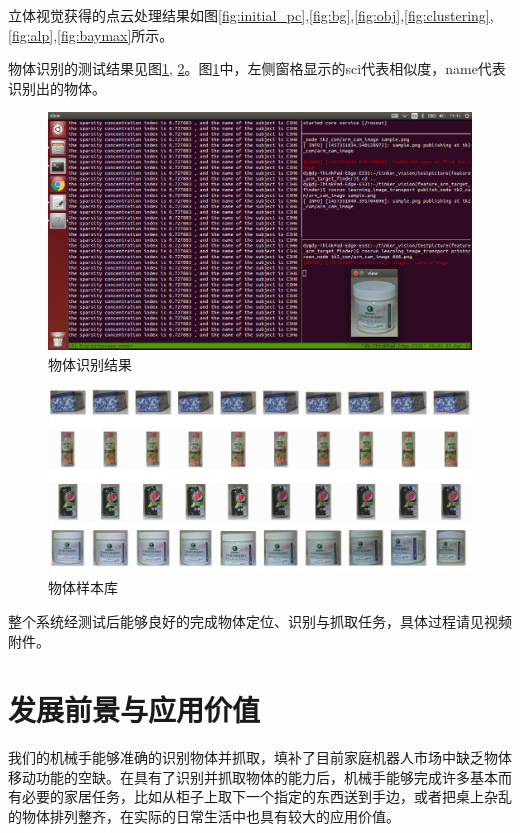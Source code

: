立体视觉获得的点云处理结果如图\ref{fig:initial_pc},\ref{fig:bg},\ref{fig:obj},\ref{fig:clustering},\ref{fig:alp},\ref{fig:baymax}所示。

物体识别的测试结果见图\ref{fig:du1}, \ref{fig:du2}。图\ref{fig:du1}中，左侧窗格显示的sci代表相似度，name代表识别出的物体。

\begin{figure}[H]
    \includegraphics[width = \textwidth]{images/du1.png}
    \caption{物体识别结果}
    \label{fig:du1}
\end{figure}

\begin{figure}[H]
    \includegraphics[width = \textwidth]{images/du2.png}
    \caption{物体样本库}
    \label{fig:du2}
\end{figure}

整个系统经测试后能够良好的完成物体定位、识别与抓取任务，具体过程请见视频附件。

\section{发展前景与应用价值}

我们的机械手能够准确的识别物体并抓取，填补了目前家庭机器人市场中缺乏物体移动功能的空缺。在具有了识别并抓取物体的能力后，机械手能够完成许多基本而有必要的家居任务，比如从柜子上取下一个指定的东西送到手边，或者把桌上杂乱的物体排列整齐，在实际的日常生活中也具有较大的应用价值。

